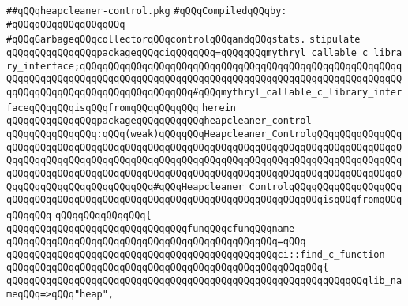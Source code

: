 \label{src/lib/std/src/nj/heapcleaner-control.pkg}
\verb|##qQQqheapcleaner-control.pkg|\newline
\newline
\verb|#qQQqCompiledqQQqby:|\newline
\verb|#qQQqqQQqqQQqqQQqqQQq|\newline
\newline
\verb|#qQQqGarbageqQQqcollectorqQQqcontrolqQQqandqQQqstats.|\newline
\newline
\verb|stipulate|\newline
\verb|qQQqqQQqqQQqqQQqpackageqQQqciqQQqqQQq=qQQqqQQqmythryl_callable_c_library_interface;qQQqqQQqqQQqqQQqqQQqqQQqqQQqqQQqqQQqqQQqqQQqqQQqqQQqqQQqqQQqqQQqqQQqqQQqqQQqqQQqqQQqqQQqqQQqqQQqqQQqqQQqqQQqqQQqqQQqqQQqqQQqqQQqqQQqqQQqqQQqqQQqqQQqqQQqqQQqqQQq#qQQqmythryl_callable_c_library_interfaceqQQqqQQqisqQQqfromqQQqqQQqqQQq|\newline
\verb|herein|\newline
\newline
\verb|qQQqqQQqqQQqqQQqpackageqQQqqQQqqQQqheapcleaner_control|\newline
\verb|qQQqqQQqqQQqqQQq:qQQq(weak)qQQqqQQqHeapcleaner_ControlqQQqqQQqqQQqqQQqqQQqqQQqqQQqqQQqqQQqqQQqqQQqqQQqqQQqqQQqqQQqqQQqqQQqqQQqqQQqqQQqqQQqqQQqqQQqqQQqqQQqqQQqqQQqqQQqqQQqqQQqqQQqqQQqqQQqqQQqqQQqqQQqqQQqqQQqqQQqqQQqqQQqqQQqqQQqqQQqqQQqqQQqqQQqqQQqqQQqqQQqqQQqqQQqqQQqqQQqqQQqqQQqqQQqqQQqqQQqqQQqqQQqqQQqqQQq#qQQqHeapcleaner_ControlqQQqqQQqqQQqqQQqqQQqqQQqqQQqqQQqqQQqqQQqqQQqqQQqqQQqqQQqqQQqqQQqqQQqqQQqqQQqisqQQqfromqQQqqQQqqQQq|\newline
\verb|qQQqqQQqqQQqqQQq{|\newline
\verb|qQQqqQQqqQQqqQQqqQQqqQQqqQQqqQQqfunqQQqcfunqQQqname|\newline
\verb|qQQqqQQqqQQqqQQqqQQqqQQqqQQqqQQqqQQqqQQqqQQqqQQq=qQQq|\newline
\verb|qQQqqQQqqQQqqQQqqQQqqQQqqQQqqQQqqQQqqQQqqQQqqQQqci::find_c_function|\newline
\verb|qQQqqQQqqQQqqQQqqQQqqQQqqQQqqQQqqQQqqQQqqQQqqQQqqQQqqQQq{|\newline
\verb|qQQqqQQqqQQqqQQqqQQqqQQqqQQqqQQqqQQqqQQqqQQqqQQqqQQqqQQqqQQqqQQqlib_nameqQQq=>qQQq"heap",|\newline
